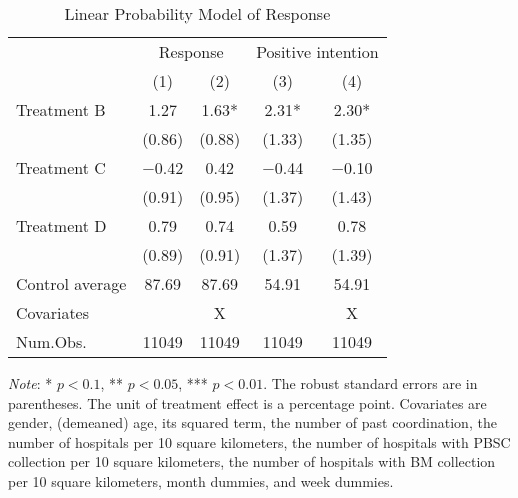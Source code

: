 \documentclass[12pt, a4paper]{article}
\begin{document}
\begin{table}[H]

\caption{\label{tab:reply-lm}Linear Probability Model of Response}
\centering
\fontsize{9}{11}\selectfont
\begin{threeparttable}
\begin{tabular}[t]{lcccc}
\toprule
\multicolumn{1}{c}{ } & \multicolumn{2}{c}{Response} & \multicolumn{2}{c}{Positive intention} \\
\cmidrule(l{3pt}r{3pt}){2-3} \cmidrule(l{3pt}r{3pt}){4-5}
  & (1) & (2) & (3) & (4)\\
\midrule
Treatment B & \num{1.27} & \num{1.63}* & \num{2.31}* & \num{2.30}*\\
 & (\num{0.86}) & (\num{0.88}) & (\num{1.33}) & (\num{1.35})\\
Treatment C & \num{-0.42} & \num{0.42} & \num{-0.44} & \num{-0.10}\\
 & (\num{0.91}) & (\num{0.95}) & (\num{1.37}) & (\num{1.43})\\
Treatment D & \num{0.79} & \num{0.74} & \num{0.59} & \num{0.78}\\
 & (\num{0.89}) & (\num{0.91}) & (\num{1.37}) & (\num{1.39})\\
\midrule
Control average & 87.69 & 87.69 & 54.91 & 54.91\\
Covariates &  & X &  & X\\
Num.Obs. & \num{11049} & \num{11049} & \num{11049} & \num{11049}\\
\bottomrule
\end{tabular}
\begin{tablenotes}
\item \emph{Note}: * $p < 0.1$, ** $p < 0.05$, *** $p < 0.01$. The robust standard errors are in parentheses. The unit of treatment effect is a percentage point. Covariates are gender, (demeaned) age, its squared term, the number of past coordination, the number of hospitals per 10 square kilometers, the number of hospitals with PBSC collection per 10 square kilometers, the number of hospitals with BM collection per 10 square kilometers, month dummies, and week dummies.
\end{tablenotes}
\end{threeparttable}
\end{table}
\end{document}
